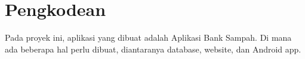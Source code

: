 \section{Pengkodean}
Pada proyek ini, aplikasi yang dibuat adalah Aplikasi Bank Sampah. Di mana ada beberapa hal perlu dibuat, diantaranya database, website, dan Android app.


